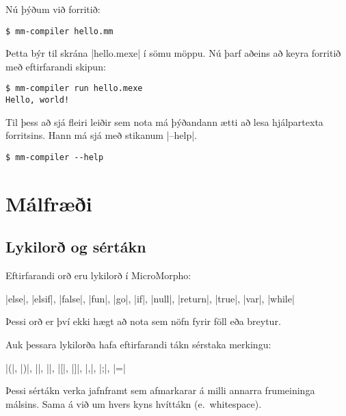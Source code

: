 \documentclass[12pt]{article}
\begin{document}
Nú þýðum við forritið:

\begin{mdframed}[style=langframe]
\begin{Verbatim}
$ mm-compiler hello.mm
\end{Verbatim}
\end{mdframed}

Þetta býr til skrána |hello.mexe| í sömu möppu.
Nú þarf aðeins að keyra forritið með eftirfarandi skipun:

\begin{mdframed}[style=langframe]
\begin{Verbatim}
$ mm-compiler run hello.mexe
Hello, world!
\end{Verbatim}
\end{mdframed}

Til þess að sjá fleiri leiðir sem nota má þýðandann
ætti að lesa hjálpartexta forritsins.
Hann má sjá með stikanum |--help|.

\begin{mdframed}[style=langframe]
\begin{Verbatim}
$ mm-compiler --help
\end{Verbatim}
\end{mdframed}

\section{Málfræði}
\subsection{Lykilorð og sértákn}\label{keywords}
Eftirfarandi orð eru lykilorð í MicroMorpho:

\begin{center}
    |else|,
    |elsif|,
    |false|,
    |fun|,
    |go|,
    |if|,
    |null|,
    |return|,
    |true|,
    |var|,
    |while|
\end{center}

Þessi orð er því ekki hægt að nota sem nöfn fyrir föll eða breytur.

Auk þessara lykilorða hafa eftirfarandi tákn sérstaka merkingu:

\begin{center}
    |(|,
    |)|,
    |{|,
    |}|,
    |[|,
    |]|,
    |,|,
    |;|,
    |=|
\end{center}

Þessi sértákn verka jafnframt sem afmarkarar á milli annarra frumeininga málsins.
Sama á við um hvers kyns hvíttákn (e.~whitespace).
\end{document}
